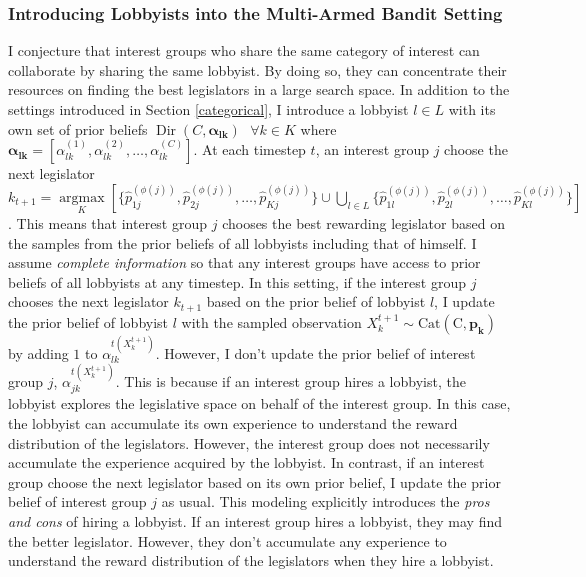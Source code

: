 \documentclass{article}
\begin{document}
\subsubsection{\normalsize{Introducing Lobbyists into the Multi-Armed Bandit Setting}}\label{arml}
I conjecture 
that interest groups who share the same category of interest
can collaborate by sharing the same lobbyist. 
By doing so, they can concentrate their resources on finding the best legislators in a large search space.
In addition to the settings introduced in Section \ref{categorical},
I introduce a lobbyist $l \in L$ with its own set 
of prior beliefs $\operatorname{Dir}(C, \mathbf{\alpha_{lk}}) \text{ } \forall k \in K$ 
where $\mathbf{\alpha_{lk}} = [\alpha_{lk}^{(1)}, \alpha_{lk}^{(2)}, \hdots, \alpha_{lk}^{(C)}]$.
At each timestep $t$,
an interest group $j$ choose 
the next legislator $k_{t+1} = \underset{K}{\operatorname{argmax}}\left[\{\hat{p}^{(\phi(j))}_{1j}, \hat{p}^{(\phi(j))}_{2j}, \hdots, \hat{p}^{(\phi(j))}_{Kj}\}\cup\bigcup_{l\in L}\{\hat{p}^{(\phi(j))}_{1l}, \hat{p}^{(\phi(j))}_{2l}, \hdots, \hat{p}^{(\phi(j))}_{Kl}\}\right]$. 
This means that 
interest group $j$ chooses the best rewarding legislator based on the samples from the prior beliefs of all lobbyists including that of himself.
I assume \textit{complete information} so that 
any interest groups have  
access to prior beliefs of all lobbyists at any timestep. 
In this setting, 
if the interest group $j$ 
chooses the next legislator $k_{t+1}$ 
based on 
the prior belief of lobbyist $l$, 
I update the prior belief of lobbyist 
$l$ with the sampled observation $X_{k}^{t+1} \sim \operatorname{Cat(C, \mathbf{p_k})}$
by adding $1$ to $\alpha_{lk}^{t(X_k^{t+1})}$.
However, 
I don't update the 
prior belief of interest group $j$, $\alpha_{jk}^{t(X_k^{t+1})}$.
This is because
if an interest group hires a lobbyist,
the lobbyist explores the legislative space on behalf of the interest group. 
In this case, the lobbyist can accumulate its own experience to understand the reward distribution of the legislators.
However, 
the interest group does not necessarily 
accumulate the experience acquired by the lobbyist.
In contrast, 
if an interest group choose the next legislator 
based on its own prior belief,
I update the prior belief of interest group $j$ as usual.
This modeling explicitly introduces the \textit{pros and cons} of hiring a lobbyist.
If an interest group hires a lobbyist, they 
may find the better legislator. However, 
they don't accumulate any experience to understand the reward distribution of the legislators
when they hire a lobbyist.
\end{document}
